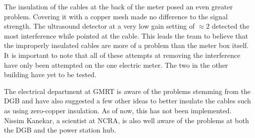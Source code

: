 \documentclass[a4paper,12pt]{article}
\begin{document}
                                                                                                                                                                                                                                                                                                                                                                                                                                                                                                                                                                                                                                                                                                                                                    The insulation of the cables at the back of the meter posed an even greater problem. Covering it with a copper mesh made no difference to the signal strength. The ultrasound detector at a very low gain setting of $\approx 2$ detected the most interference while pointed at the cable. This leads the team to believe that the improperly insulated cables are more of a problem than the meter box itself. It is important to note that all of these attempts at removing the interference have only been attempted on the one electric meter. The two in the other building have yet to be tested.

                                                                                                                                                                                                                                                                                                                                                                                                                                                                                                                                                                                                                                                                                                                                                                                  The electrical department at GMRT is aware of the problems stemming from the DGB and have also suggested a few other ideas to better insulate the cables such as using zero-copper insulation. As of now, this has not been implemented. Nissim Kanekar, a scientist at NCRA, is also well aware of the problems at both the DGB and the power station hub.
\end{document}
